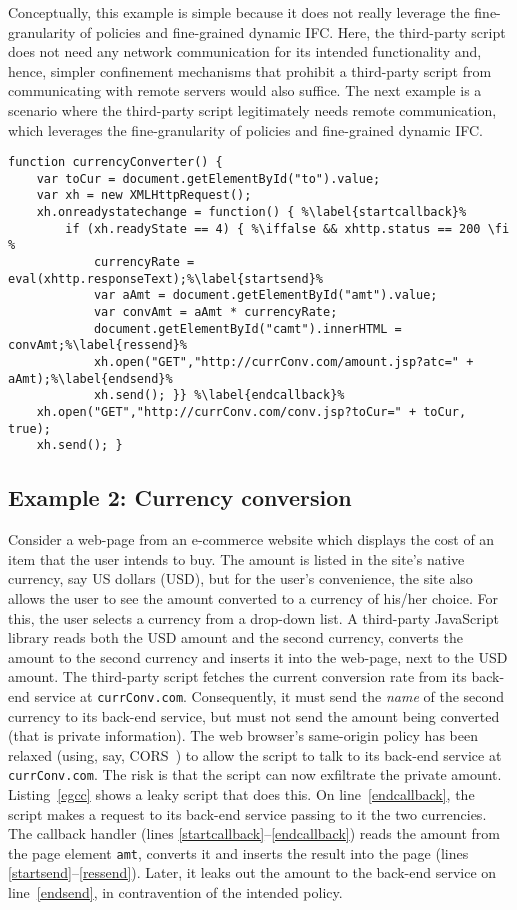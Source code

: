 Conceptually, this example is simple because it does not really
leverage the fine-granularity of {\sys} policies and fine-grained
dynamic IFC. Here, the third-party script does not need any network
communication for its intended functionality and, hence, simpler
confinement mechanisms that prohibit a third-party script from
communicating with remote servers would also suffice. The next example 
is a scenario where the third-party script legitimately needs remote
communication, which leverages the fine-granularity of {\sys} policies
and fine-grained dynamic IFC.

\begin{lstlisting}[float, caption=Currency converter script that leaks a private amount,label=egcc,escapechar=\%]
function currencyConverter() {
	var toCur = document.getElementById("to").value;
	var xh = new XMLHttpRequest();
	xh.onreadystatechange = function() { %\label{startcallback}%
		if (xh.readyState == 4) { %\iffalse && xhttp.status == 200 \fi %
			currencyRate = eval(xhttp.responseText);%\label{startsend}%
			var aAmt = document.getElementById("amt").value;
			var convAmt = aAmt * currencyRate;
			document.getElementById("camt").innerHTML = convAmt;%\label{ressend}%
			xh.open("GET","http://currConv.com/amount.jsp?atc=" + aAmt);%\label{endsend}%
			xh.send(); }} %\label{endcallback}%
	xh.open("GET","http://currConv.com/conv.jsp?toCur=" + toCur, true);
	xh.send(); }
\end{lstlisting}


\subsection{Example 2: Currency conversion}
Consider a web-page from an e-commerce website which displays the cost
of an item that the user intends to buy. The amount is listed in the
site's native currency, say US dollars (USD), but for the user's
convenience, the site also allows the user to see the amount converted
to a currency of his/her choice. For this, the user selects a currency
from a drop-down list. A third-party JavaScript library reads both the
USD amount and the second currency, converts the amount to the second
currency and inserts it into the web-page, next to the USD amount.
%
The third-party script fetches the current conversion rate from its
back-end service at \texttt{currConv.com}. Consequently, it must send
the \emph{name} of the second currency to its back-end service, but
must not send the amount being converted (that is private
information). The web browser's same-origin policy has been relaxed
(using, say, CORS~\cite{cors}) to allow the script to talk to its
back-end service at \texttt{currConv.com}. The risk is that the script
can now exfiltrate the private amount. Listing~\ref{egcc} shows a
leaky script that does this. On line~\ref{endcallback}, the script
makes a request to its back-end service passing to it the two
currencies. The callback handler (lines
\ref{startcallback}--\ref{endcallback}) reads the amount from the page
element \texttt{amt}, converts it and inserts the result into the page
(lines \ref{startsend}--\ref{ressend}). Later, it leaks out the amount
to the back-end service on line~\ref{endsend}, in contravention of the
intended policy.

